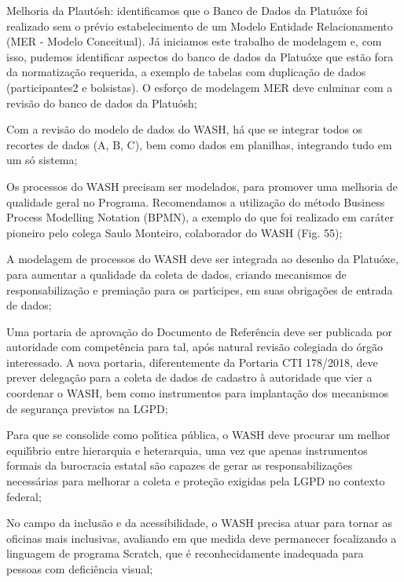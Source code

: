 \documentclass[
12pt,		%
openright,	%
twoside,  %
a4paper,			%
chapter=TITLE,		%
english,			%
french,				%
spanish,			%
brazil				%
]{USPSC-classe/USPSC}
\begin{document}
\begin{alineas}
\item Melhoria da Plaut\'osh: identificamos que o Banco de Dados da Platu\'oxe foi realizado sem o pr\'evio estabelecimento de um Modelo Entidade Relacionamento (MER - Modelo Conceitual). J\'a iniciamos este trabalho de modelagem e, com isso, pudemos identificar aspectos do banco de dados da Platu\'oxe que est\~ao fora da normatiza\c{c}\~ao requerida, a exemplo de tabelas com duplica\c{c}\~ao de dados (participantes2 e bolsistas). O esfor\c{c}o de modelagem MER deve culminar com a revis\~ao do banco de dados da Platu\'osh;
\item Com a revis\~ao do modelo de dados do WASH, h\'a que se integrar todos os recortes de dados (A, B, C), bem como dados em planilhas, integrando tudo em um s\'o sistema;
\item Os processos do WASH precisam ser modelados, para promover uma melhoria de qualidade geral no Programa. Recomendamos a utiliza\c{c}\~ao do m\'etodo Business Process Modelling Notation (BPMN), a exemplo do que foi realizado em car\'ater pioneiro pelo colega Saulo Monteiro, colaborador do WASH (Fig. 55);
\item A modelagem de processos do WASH deve ser integrada ao desenho da Platu\'oxe, para aumentar a qualidade da coleta de dados, criando mecanismos de responsabiliza\c{c}\~ao e premia\c{c}\~ao para os part\'{\i}cipes, em suas obriga\c{c}\~oes de entrada de dados;
\item Uma portaria de aprova\c{c}\~ao do Documento de Refer\^encia deve ser publicada por autoridade com compet\^encia para tal, ap\'os natural revis\~ao colegiada do \'org\~ao interessado. A nova portaria, diferentemente da Portaria CTI 178/2018, deve prever delega\c{c}\~ao para a coleta de dados de cadastro \`a autoridade que vier a coordenar o WASH, bem como instrumentos para implanta\c{c}\~ao dos mecanismos de seguran\c{c}a previstos na LGPD;
\item Para que se consolide como pol\'{\i}tica p\'ublica, o WASH deve procurar um melhor equil\'{\i}brio entre hierarquia e heterarquia, uma vez que apenas instrumentos formais da burocracia estatal s\~ao capazes de gerar as responsabiliza\c{c}\~oes necess\'arias para melhorar a coleta e prote\c{c}\~ao exigidas pela LGPD no contexto federal;
\item No campo da inclus\~ao e da acessibilidade, o WASH precisa atuar para tornar as oficinas mais inclusivas, avaliando em que medida deve permanecer focalizando a linguagem de programa Scratch, que \'e reconhecidamente inadequada para pessoas com defici\^encia visual;

\end{alineas}
\end{document}
